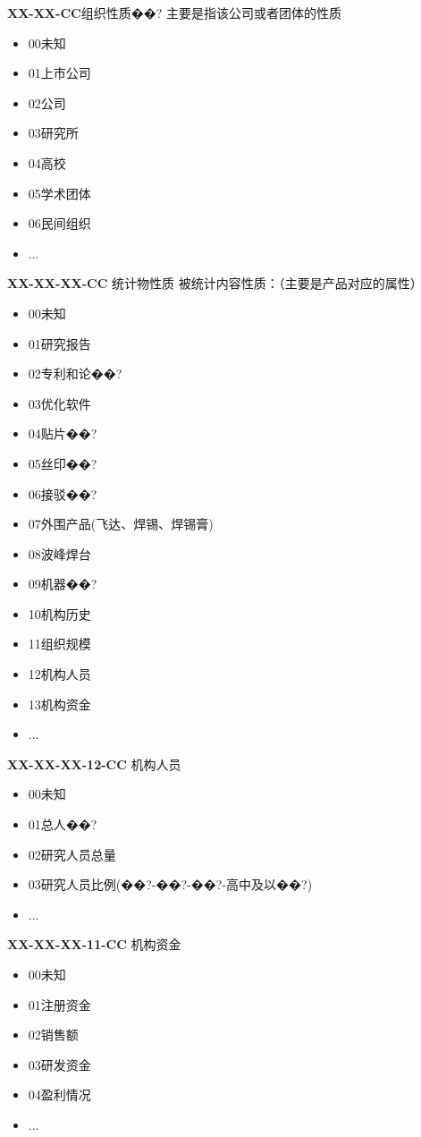 \documentclass[a4paper,12pt]{article}
\begin{document}
\textbf{XX-XX-CC}组织性质��? 主要是指该公司或者团体的性质
\begin{itemize}
  \item 00未知%
  \item 01上市公司
  \item 02公司
  \item 03研究所
  \item 04高校
  \item 05学术团体
  \item 06民间组织
  \item ...
\end{itemize}

\textbf{XX-XX-XX-CC} 统计物性质
被统计内容性质：（主要是产品对应的属性）
\begin{itemize}
  \item 00未知%
  \item 01研究报告%
  \item 02专利和论��?%
  \item 03优化软件
  \item 04贴片��?
  \item 05丝印��?
  \item 06接驳��?
  \item 07外围产品(飞达、焊锡、焊锡膏)
  \item 08波峰焊台
  \item 09机器��?
  \item 10机构历史
  \item 11组织规模
  \item 12机构人员
  \item 13机构资金
  \item ...
\end{itemize}

\textbf{XX-XX-XX-12-CC} 机构人员
\begin{itemize}
  \item 00未知%
  \item 01总人��?
  \item 02研究人员总量
  \item 03研究人员比例(��?-��?-��?-高中及以��?)
  \item ...
\end{itemize}

\textbf{XX-XX-XX-11-CC} 机构资金
\begin{itemize}
  \item 00未知%
  \item 01注册资金
  \item 02销售额
  \item 03研发资金
  \item 04盈利情况
  \item ...
\end{itemize}
\end{document}
